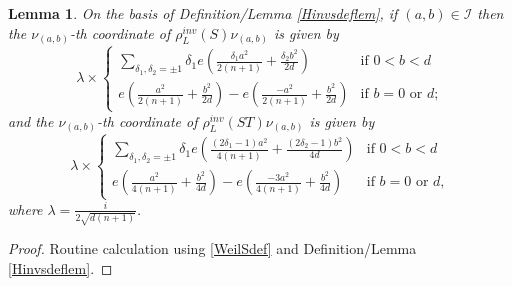 \documentclass[12pt, a4paper]{article}
\newtheorem{lemma}[thm]{Lemma}
\newcommand{\ic}{\mathcal{I}}
\begin{document}
  \begin{lemma}\label{rhoinvSSTlemma}
    On the basis of Definition/Lemma \ref{Hinvsdeflem},
   if $(a,b) \in \ic$ then the $\nu_{(a,b)}$-th coordinate of $\rho_L^{inv}(S)\nu_{(a,b)}$ is given by
    \[
    \lambda \times 
    \begin{cases}
      \sum_{\delta_1, \delta_2 = \pm 1}
      \delta_1 e \left ( \frac{\delta_1 a^2}{2(n+1)} + \frac{\delta_2 b^2}{2d} \right )
      & \text{if $0<b<d$} \\
      e \left ( \frac{a^2}{2(n+1)} + \frac{b^2}{2d} \right )
      - e \left ( \frac{-a^2}{2(n+1)} + \frac{b^2}{2d} \right ) 
      & \text{if $b = 0$ or $d$;}
 \end{cases}
    \]
    and the $\nu_{(a,b)}$-th coordinate of $\rho_L^{inv}(ST) \nu_{(a,b)}$ is given by
    \[
    \lambda \times 
    \begin{cases}
      \sum_{\delta_1, \delta_2 = \pm 1}
      \delta_1 e \left ( \frac{(2\delta_1 - 1) a^2}{4(n+1)} + \frac{(2\delta_2 - 1) b^2}{4d} \right )
      & \text{if  $0<b<d$} \\
      e \left ( \frac{a^2}{4(n+1)} + \frac{b^2}{4d} \right )
      - e \left ( \frac{-3a^2}{4(n+1)} + \frac{b^2}{4d} \right )
      & \text{if $b = 0$ or $d$,}
 \end{cases}
 \]
    where $\lambda = \frac{i}{2\sqrt{d(n+1)}}$.
  \end{lemma}
  \begin{proof}
    Routine calculation using \eqref{WeilSdef} and Definition/Lemma \ref{Hinvsdeflem}.
  \end{proof}
\end{document}
